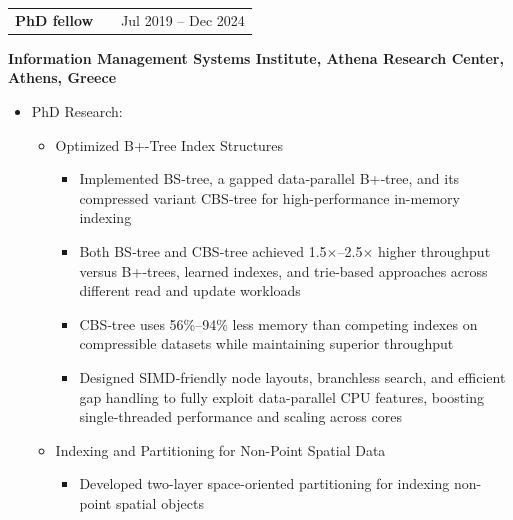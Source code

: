 \documentclass[a4paper,10pt]{article}
\makeatletter
\newenvironment{job}[2]
{
	\begin{tabularx}{\linewidth}{@{}l X r@{}}
		\small
		\textbf{#1} & \hfill &  #2 \\[3.75pt]
	\end{tabularx}
	\footnotesize
	\setlength{\parskip}{3pt} %
	\setlength{\parindent}{0pt} %
}
{
}
\makeatother
\begin{document}
\vspace{-1\baselineskip}


\begin{job}{PhD fellow}{Jul 2019 – Dec 2024}
	\textbf{Information Management Systems Institute, Athena Research Center, Athens, Greece} 
	
	\begin{itemize}
	
		\item PhD Research: 
	
		\begin{itemize}
			
			\item Optimized B+-Tree Index Structures
				\begin{itemize}
			
				\item Implemented BS‑tree, a gapped data‑parallel B+‑tree, and its compressed variant CBS‑tree for high-performance in-memory indexing
			
				\item Both BS‑tree and CBS‑tree achieved 1.5$\times$–2.5$\times$ higher throughput versus B+-trees, learned indexes, and trie-based approaches across different read and update workloads
			
				\item CBS‑tree uses 56\%–94\% less memory than competing indexes on compressible datasets while maintaining superior throughput
			
				\item Designed SIMD‑friendly node layouts, branchless search, and efficient gap handling to fully exploit data-parallel CPU features, boosting single-threaded performance and scaling across cores
			
			\end{itemize}
		
		\item Indexing and Partitioning for Non-Point Spatial Data
		
			\begin{itemize}
				\item Developed two-layer space-oriented partitioning for indexing non-point spatial objects
				

\end{itemize}
\end{itemize}
\end{itemize}
\end{job}
\end{document}
